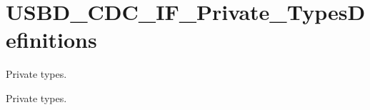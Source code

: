 \hypertarget{group___u_s_b_d___c_d_c___i_f___private___types_definitions}{
\section{USBD\_\-CDC\_\-IF\_\-Private\_\-TypesDefinitions}
\label{group___u_s_b_d___c_d_c___i_f___private___types_definitions}
}
Private types.  


Private types. 